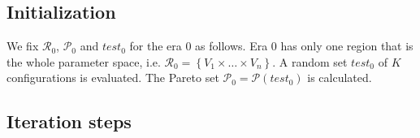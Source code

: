 
\subsection{Initialization}
We fix $\mathcal{R}_0$, $\mathscr{P}_0$ and $test_0$ for the era $0$ as follows. Era $0$ has only one region that is the whole parameter space,
i.e. $\mathcal{R}_{0}=\left\{ V_{1}\times\dots\times V_{n}\right\} $.
A random set $test_{0}$ of $K$ configurations is evaluated. The
Pareto set $\mathscr{P}_{0}=\mathscr{P}\left(test_{0}\right)$ is
calculated.



\subsection{Iteration steps}

